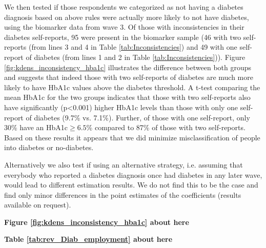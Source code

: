 \documentclass[12pt,english]{article}
\begin{document}
\begin{appendix}
We then tested if those respondents we categorized as not having a diabetes diagnosis based on above rules were actually more likely to not have diabetes, using the biomarker data from wave 3. Of those with inconsistencies in their diabetes self-reports, 95 were present in the biomarker sample (46 with two self-reports (from lines 3 and 4 in Table \ref{tab:Inconsistencies}) and 49 with one self-report of diabetes (from lines 1 and 2 in Table \ref{tab:Inconsistencies})). Figure \ref{fig:kdens_inconsistency_hba1c} illustrates the difference between both groups and suggests that indeed those with two self-reports of diabetes are much more likely to have \ac{HbA1c} values above the diabetes threshold. A t-test comparing the mean \ac{HbA1c} for the two groups indicates that those with two self-reports also have significantly (p<0.001) higher \ac{HbA1c} levels than those with only one self-report of diabetes (9.7\% vs. 7.1\%). Further, of those with one self-report,  only 30\% have an \ac{HbA1c}$\geq6.5$\% compared to 87\% of those with two self-reports. Based on these results it appears that we did minimize misclassification of people into diabetes or no-diabetes. 

Alternatively we also test if using an alternative strategy, i.e. assuming that everybody who reported  a diabetes diagnosis once had diabetes in any later wave, would lead to different estimation results. We do not find this to be the case and find only minor differences in the point estimates of the coefficients (results available on request). 

\begin{center}
	\textbf{Figure \ref{fig:kdens_inconsistency_hba1c} about here}
\end{center}

\begin{center}
	\textbf{Table \ref{tab:rev_Diab_employment} about here}
\end{center}



\end{appendix}






\printbibliography

\clearpage
\end{document}
